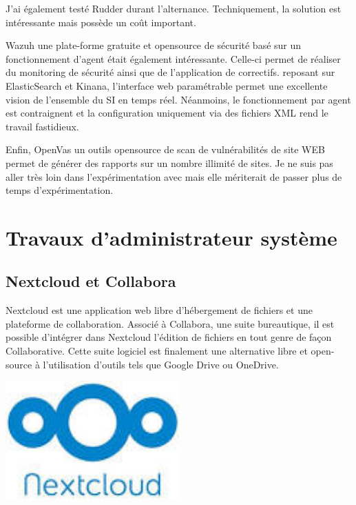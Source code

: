 \documentclass[12pt]{article}
\begin{document}
J'ai également testé Rudder durant l'alternance. 
Techniquement, la solution est intéressante mais possède un coût important.

Wazuh une plate-forme gratuite et opensource de sécurité basé sur un fonctionnement d'agent était également intéressante. 
Celle-ci permet de réaliser du monitoring de sécurité ainsi que de l'application de correctifs. reposant sur ElasticSearch et Kinana, l'interface web paramétrable permet une excellente vision de l'ensemble du SI en temps réel. 
Néanmoins, le fonctionnement par agent est contraignent et la configuration uniquement via des fichiers XML rend le travail fastidieux.

Enfin, OpenVas un outils opensource de scan de vulnérabilités de site WEB permet de générer des rapports sur un nombre illimité de sites. 
Je ne suis pas aller très loin dans l'expérimentation avec mais elle mériterait de passer plus de temps d'expérimentation.

\newpage
\section{Travaux d'administrateur système}
\subsection{Nextcloud et Collabora}
\noindent%
\begin{minipage}{.7\textwidth}%
Nextcloud est une application web libre d'hébergement de fichiers et une plateforme de collaboration. 
Associé à Collabora, une suite bureautique, il est possible d'intégrer dans Nextcloud l'édition de fichiers en tout genre de façon Collaborative. 
Cette suite logiciel est finalement une alternative libre et open-source à l'utilisation d'outils tels que Google Drive ou OneDrive.
\end{minipage}%
\hfill
\begin{minipage}{.3\textwidth}%
\begin{center}
\includegraphics[width=0.5\textwidth]{src/logo_nextcloud.jpeg}
\end{center}
\end{minipage}%
\end{document}
